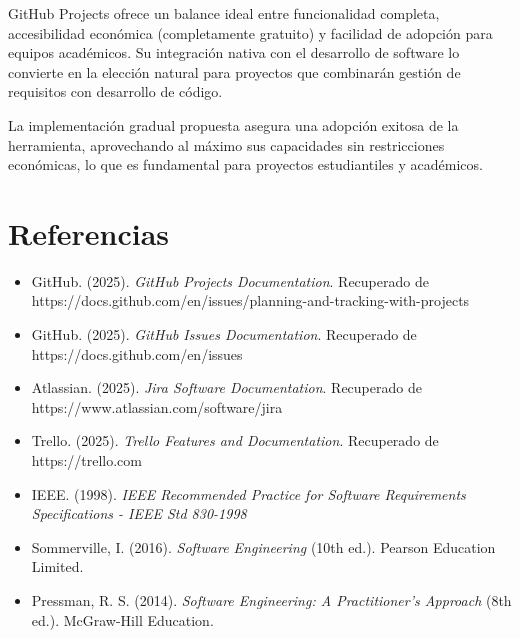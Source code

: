\documentclass[12pt,a4paper]{article}
\begin{document}
GitHub Projects ofrece un balance ideal entre funcionalidad completa, accesibilidad económica (completamente gratuito) y facilidad de adopción para equipos académicos. Su integración nativa con el desarrollo de software lo convierte en la elección natural para proyectos que combinarán gestión de requisitos con desarrollo de código.

La implementación gradual propuesta asegura una adopción exitosa de la herramienta, aprovechando al máximo sus capacidades sin restricciones económicas, lo que es fundamental para proyectos estudiantiles y académicos.

\section{Referencias}

\begin{itemize}
    \item GitHub. (2025). \textit{GitHub Projects Documentation}. Recuperado de https://docs.github.com/en/issues/planning-and-tracking-with-projects
    \item GitHub. (2025). \textit{GitHub Issues Documentation}. Recuperado de https://docs.github.com/en/issues
    \item Atlassian. (2025). \textit{Jira Software Documentation}. Recuperado de https://www.atlassian.com/software/jira
    \item Trello. (2025). \textit{Trello Features and Documentation}. Recuperado de https://trello.com
    \item IEEE. (1998). \textit{IEEE Recommended Practice for Software Requirements Specifications - IEEE Std 830-1998}
    \item Sommerville, I. (2016). \textit{Software Engineering} (10th ed.). Pearson Education Limited.
    \item Pressman, R. S. (2014). \textit{Software Engineering: A Practitioner's Approach} (8th ed.). McGraw-Hill Education.
\end{itemize}
\end{document}
